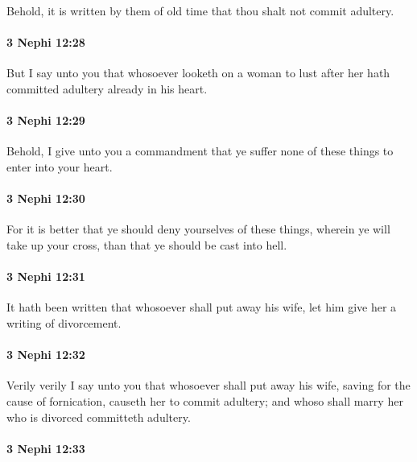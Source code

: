 			Behold, it is written by them of old time
			that thou shalt not commit adultery.

		\paragraph{3 Nephi 12:28} %
			\label{3NEPHI-12-28}

			But I say unto you
			that whosoever looketh on a woman to lust after her
			hath committed adultery already in his heart.

		\paragraph{3 Nephi 12:29} %
			\label{3NEPHI-12-29}

			Behold, I give unto you a commandment
			that ye suffer none of these things to enter into your heart.

		\paragraph{3 Nephi 12:30} %
			\label{3NEPHI-12-30}

			For it is better that ye should deny yourselves of these things,
			wherein ye will take up your cross,
			than that ye should be cast into hell.

		\paragraph{3 Nephi 12:31} %
			\label{3NEPHI-12-31}

			It hath been written that whosoever shall put away his wife,
			let him give her a writing of divorcement.

		\paragraph{3 Nephi 12:32} %
			\label{3NEPHI-12-32}

			Verily verily I say unto you
			that whosoever shall put away his wife,
			saving for the cause of fornication,
			causeth her to commit adultery;
			and whoso shall marry her who is divorced committeth adultery.

		\paragraph{3 Nephi 12:33} %
			\label{3NEPHI-12-33}


